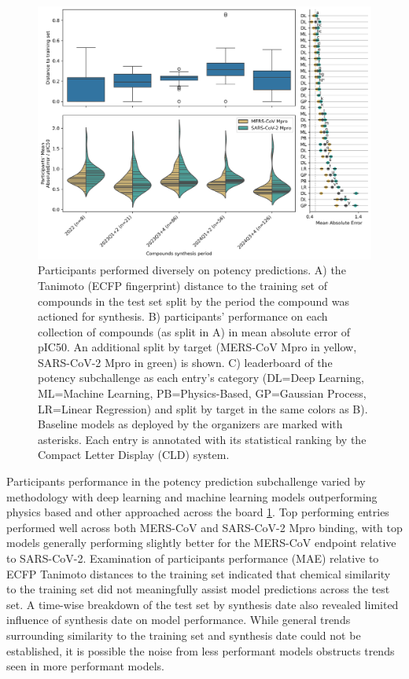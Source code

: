 \documentclass[journal=jcim,manuscript=article]{achemso}
\begin{document}
\begin{figure}
    \includegraphics[scale=0.6]{04_figs_leaderboards/potency_leaderboards_and_progressions.png}
  \caption{Participants performed diversely on potency predictions. A) the Tanimoto (ECFP fingerprint) distance to the training set of compounds in the test set split by the period the compound was actioned for synthesis. B) participants' performance on each collection of compounds (as split in A) in mean absolute error of pIC50. An additional split by target (MERS-CoV Mpro in yellow, SARS-CoV-2 Mpro in green) is shown. C) leaderboard of the potency subchallenge as each entry's category (DL=Deep Learning, ML=Machine Learning, PB=Physics-Based, GP=Gaussian Process, LR=Linear Regression) and split by target in the same colors as B). Baseline models as deployed by the organizers are marked with asterisks. Each entry is annotated with its statistical ranking by the Compact Letter Display (CLD) system\cite{cld_algorithm_2004}.}
  \label{fgr:potency_leaderboards}
\end{figure}

Participants performance in the potency prediction subchallenge varied by methodology with deep learning and machine learning models outperforming physics based and other approached across the board \ref{fgr:potency_leaderboards}. Top performing entries performed well across both MERS-CoV and SARS-CoV-2 Mpro binding, with top models generally performing slightly better for the MERS-CoV endpoint relative to SARS-CoV-2. Examination of participants performance (MAE) relative to ECFP Tanimoto distances to the training set indicated that chemical similarity to the training set did not meaningfully assist model predictions across the test set. A time-wise breakdown of the test set by synthesis date also revealed limited influence of synthesis date on model performance. While general trends surrounding similarity to the training set and synthesis date could not be established, it is possible the noise from less performant models obstructs trends seen in more performant models.
\end{document}
